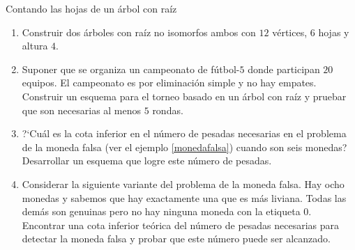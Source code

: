 \begin{section}{Contando las hojas de un árbol con raíz}
\begin{enumerate}
\item Construir dos árboles con raíz no isomorfos ambos con $12$ vértices, $6$ hojas y altura $4$.	
	
\item Suponer que se organiza un campeonato de fútbol-$5$ donde participan
$20$ equipos. El cam\-peo\-na\-to es por eliminación simple y no hay
empates. Cons\-truir un esquema para el torneo basado en un árbol
con raíz y pruebar que son necesarias al menos $5$ rondas.
\item ?`Cuál es la cota inferior en el número de pesadas necesarias en
el problema de la moneda falsa (ver el ejemplo \ref{monedafalsa}) cuando
son seis monedas? Desarrollar un esquema que logre este número de
pesadas.

\item Considerar la siguiente variante del problema de la moneda falsa.
Hay ocho monedas y sabemos que hay exactamente una que es más
liviana. Todas las demás son genuinas pero no hay ninguna moneda
con la etiqueta $0$. Encontrar una cota inferior teórica del número
de pesadas necesarias para detectar la moneda falsa y probar que
este número puede ser alcanzado.
\end{enumerate}

\end{section}




